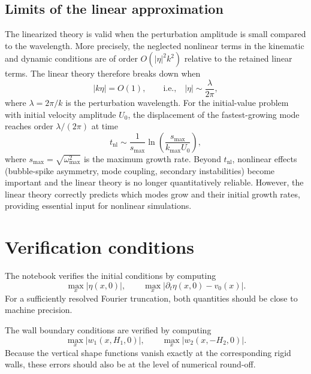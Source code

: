 \documentclass[11pt,a4paper]{article}
\begin{document}
\subsection{Limits of the linear approximation}

The linearized theory is valid when the perturbation amplitude is small compared to the wavelength.  More precisely, the neglected nonlinear terms in the kinematic and dynamic conditions are of order $O(|\eta|^2 k^2)$ relative to the retained linear terms.  The linear theory therefore breaks down when
\begin{equation}
    |k\eta| = O(1),
    \qquad
    \text{i.e.,}\quad |\eta| \sim \frac{\lambda}{2\pi},
    \label{eq:nonlinear_threshold}
\end{equation}
where $\lambda=2\pi/k$ is the perturbation wavelength.  For the initial-value problem with initial velocity amplitude $U_0$, the displacement of the fastest-growing mode reaches order $\lambda/(2\pi)$ at time
\begin{equation}
    t_{\mathrm{nl}} \sim \frac{1}{s_{\max}}\ln\!\left(\frac{s_{\max}}{k_{\max}U_0}\right),
\end{equation}
where $s_{\max}=\sqrt{\omega^2_{\max}}$ is the maximum growth rate.  Beyond $t_{\mathrm{nl}}$, nonlinear effects (bubble-spike asymmetry, mode coupling, secondary instabilities) become important and the linear theory is no longer quantitatively reliable.  However, the linear theory correctly predicts which modes grow and their initial growth rates, providing essential input for nonlinear simulations.

\section{Verification conditions}

The notebook verifies the initial conditions by computing
\begin{equation}
    \max_x |\eta(x,0)|,
    \qquad
    \max_x |\partial_t\eta(x,0)-v_0(x)|.
\end{equation}
For a sufficiently resolved Fourier truncation, both quantities should be close to machine precision.

The wall boundary conditions are verified by computing
\begin{equation}
    \max_x |w_1(x,H_1,0)|,
    \qquad
    \max_x |w_2(x,-H_2,0)|.
\end{equation}
Because the vertical shape functions vanish exactly at the corresponding rigid walls, these errors should also be at the level of numerical round-off.
\end{document}
